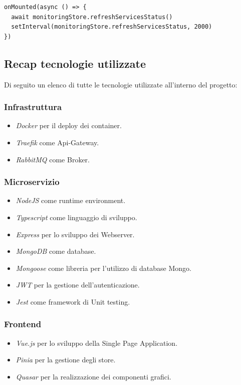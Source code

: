 \begin{lstlisting}[style=typescript, caption={Monitoring Polling - Client}, label=lst:ClientMonitoringPolling]
onMounted(async () => {
  await monitoringStore.refreshServicesStatus()
  setInterval(monitoringStore.refreshServicesStatus, 2000)
})
\end{lstlisting}

\subsection{Recap tecnologie utilizzate}

Di seguito un elenco di tutte le tecnologie utilizzate all'interno del progetto:

\subsubsection{Infrastruttura}
\begin{itemize}
    \item \textit{Docker} per il deploy dei container.
    \item \textit{Traefik} come Api-Gateway.
    \item \textit{RabbitMQ} come Broker.
\end{itemize}

\subsubsection{Microservizio}
\begin{itemize}
    \item \textit{NodeJS} come runtime environment.
    \item \textit{Typescript} come linguaggio di sviluppo.
    \item \textit{Express} per lo sviluppo dei Webserver.
    \item \textit{MongoDB} come database.
    \item \textit{Mongoose} come libreria per l'utilizzo di database Mongo.
    \item \textit{JWT} per la gestione dell'autenticazione.
    \item \textit{Jest} come framework di Unit testing.
\end{itemize}

\subsubsection{Frontend}
\begin{itemize}
    \item \textit{Vue.js} per lo sviluppo della Single Page Application.
    \item \textit{Pinia} per la gestione degli store.
    \item \textit{Quasar} per la realizzazione dei componenti grafici.
\end{itemize}


